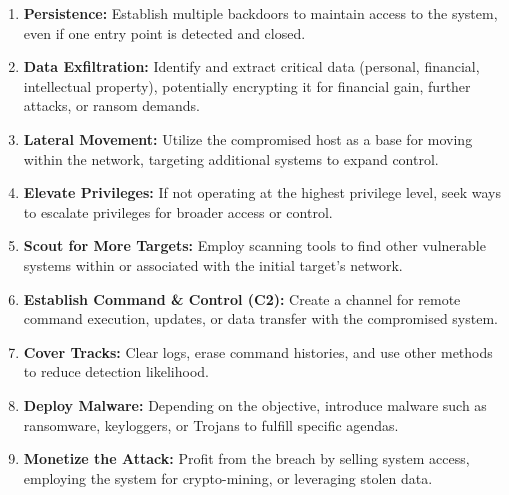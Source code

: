 \begin{enumerate}
      \item \textbf{Persistence:}
            Establish multiple backdoors to maintain access to the system, even if one entry point is detected and closed.

      \item \textbf{Data Exfiltration:}
            Identify and extract critical data (personal, financial, intellectual property), potentially encrypting it for financial gain, further attacks, or ransom demands.

      \item \textbf{Lateral Movement:}
            Utilize the compromised host as a base for moving within the network, targeting additional systems to expand control.

      \item \textbf{Elevate Privileges:}
            If not operating at the highest privilege level, seek ways to escalate privileges for broader access or control.

      \item \textbf{Scout for More Targets:}
            Employ scanning tools to find other vulnerable systems within or associated with the initial target's network.

      \item \textbf{Establish Command \& Control (C2):}
            Create a channel for remote command execution, updates, or data transfer with the compromised system.

      \item \textbf{Cover Tracks:}
            Clear logs, erase command histories, and use other methods to reduce detection likelihood.

      \item \textbf{Deploy Malware:}
            Depending on the objective, introduce malware such as ransomware, keyloggers, or Trojans to fulfill specific agendas.

      \item \textbf{Monetize the Attack:}
            Profit from the breach by selling system access, employing the system for crypto-mining, or leveraging stolen data.
\end{enumerate}

